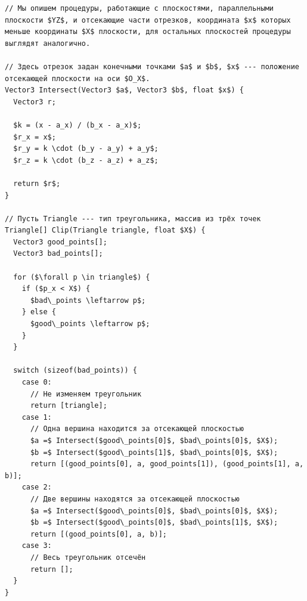 \documentclass[a4paper,12pt]{report}
\numberwithin{equation}{section}
\begin{document}
\begin{lstlisting}[float=!h,caption={Пересечение треугольника плоскостью},label=clip_algo]
// Мы опишем процедуры, работающие с плоскостями, параллельными плоскости $YZ$, и отсекающие части отрезков, координата $x$ которых меньше координаты $X$ плоскости, для остальных плоскостей процедуры выглядят аналогично.

// Здесь отрезок задан конечными точками $a$ и $b$, $x$ --- положение отсекающей плоскости на оси $O_X$.
Vector3 Intersect(Vector3 $a$, Vector3 $b$, float $x$) {
  Vector3 r;
  
  $k = (x - a_x) / (b_x - a_x)$;
  $r_x = x$;
  $r_y = k \cdot (b_y - a_y) + a_y$;
  $r_z = k \cdot (b_z - a_z) + a_z$;
  
  return $r$;
}

// Пусть Triangle --- тип треугольника, массив из трёх точек
Triangle[] Clip(Triangle triangle, float $X$) {
  Vector3 good_points[];
  Vector3 bad_points[];
  
  for ($\forall p \in triangle$) {
    if ($p_x < X$) {
      $bad\_points \leftarrow p$;
    } else {
      $good\_points \leftarrow p$;
    }
  }
  
  switch (sizeof(bad_points)) {
    case 0:
      // Не изменяем треугольник
      return [triangle];
    case 1:
      // Одна вершина находится за отсекающей плоскостью
      $a =$ Intersect($good\_points[0]$, $bad\_points[0]$, $X$);
      $b =$ Intersect($good\_points[1]$, $bad\_points[0]$, $X$);
      return [(good_points[0], a, good_points[1]), (good_points[1], a, b)];
    case 2:
      // Две вершины находятся за отсекающей плоскостью
      $a =$ Intersect($good\_points[0]$, $bad\_points[0]$, $X$);
      $b =$ Intersect($good\_points[0]$, $bad\_points[1]$, $X$);
      return [(good_points[0], a, b)];
    case 3:
      // Весь треугольник отсечён
      return [];
  }
}
\end{lstlisting}
\end{document}
